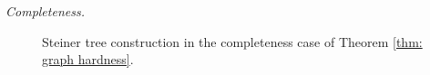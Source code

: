 \documentclass{article}\providecommand{\DeclareRedundantLanguages}[2]{}\usepackage[a4paper,margin=20mm]{geometry}
\newcommand{\1}{\textbf{1}}
\begin{document}
\begin{paragraph}{\textit{Completeness.}}
\begin{figure}[!ht]




     \caption{Steiner tree construction in the completeness case of Theorem \ref{thm: graph hardness}.}
     \label{fig: DST completeness graph}
 \end{figure}
 \end{paragraph}
 
\end{document}

